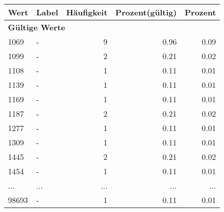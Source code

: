      \begin{longtable}{lXrrr}
     \toprule
     \textbf{Wert} & \textbf{Label} & \textbf{Häufigkeit} & \textbf{Prozent(gültig)} & \textbf{Prozent} \\
     \endhead
     \midrule
     \multicolumn{5}{l}{\textbf{Gültige Werte}}\\
        1069 & \multicolumn{1}{X}{-} & %
          \num{9} &
          \num[round-mode=places,round-precision=2]{0,96} &
          \num[round-mode=places,round-precision=2]{0,09} \\
        1099 & \multicolumn{1}{X}{-} & %
          \num{2} &
          \num[round-mode=places,round-precision=2]{0,21} &
          \num[round-mode=places,round-precision=2]{0,02} \\
        1108 & \multicolumn{1}{X}{-} & %
          \num{1} &
          \num[round-mode=places,round-precision=2]{0,11} &
          \num[round-mode=places,round-precision=2]{0,01} \\
        1139 & \multicolumn{1}{X}{-} & %
          \num{1} &
          \num[round-mode=places,round-precision=2]{0,11} &
          \num[round-mode=places,round-precision=2]{0,01} \\
        1169 & \multicolumn{1}{X}{-} & %
          \num{1} &
          \num[round-mode=places,round-precision=2]{0,11} &
          \num[round-mode=places,round-precision=2]{0,01} \\
        1187 & \multicolumn{1}{X}{-} & %
          \num{2} &
          \num[round-mode=places,round-precision=2]{0,21} &
          \num[round-mode=places,round-precision=2]{0,02} \\
        1277 & \multicolumn{1}{X}{-} & %
          \num{1} &
          \num[round-mode=places,round-precision=2]{0,11} &
          \num[round-mode=places,round-precision=2]{0,01} \\
        1309 & \multicolumn{1}{X}{-} & %
          \num{1} &
          \num[round-mode=places,round-precision=2]{0,11} &
          \num[round-mode=places,round-precision=2]{0,01} \\
        1445 & \multicolumn{1}{X}{-} & %
          \num{2} &
          \num[round-mode=places,round-precision=2]{0,21} &
          \num[round-mode=places,round-precision=2]{0,02} \\
        1454 & \multicolumn{1}{X}{-} & %
          \num{1} &
          \num[round-mode=places,round-precision=2]{0,11} &
          \num[round-mode=places,round-precision=2]{0,01} \\
       ... & ... & ... & ... & ... \\
        98693 & \multicolumn{1}{X}{-} & %
          \num{1} &
          \num[round-mode=places,round-precision=2]{0,11} &
          \num[round-mode=places,round-precision=2]{0,01} \\


\end{longtable}
